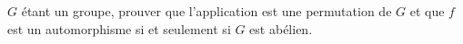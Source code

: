 $G$ étant un groupe, prouver que l'application  est une permutation de $G$ et que $f$ est un automorphisme si et seulement si $G$ est abélien.